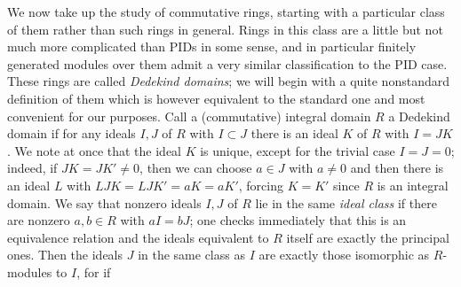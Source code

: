 We now take up the study of commutative rings, starting with a particular class of them rather than such rings in general.  Rings in this class are a little but not much more complicated than PIDs in some sense, and in particular finitely generated modules over them admit a very similar classification to the PID case.  These rings are called {\sl Dedekind domains}; we will begin with a quite nonstandard definition of them which is however equivalent to the standard one and most convenient for our purposes.  Call a (commutative) integral domain $R$ a Dedekind domain if for any ideals $I,J$ of $R$ with $I\subset J$ there is an ideal $K$ of $R$ with $I = JK$.  We note at once that the ideal $K$ is unique, except for the trivial case $I = J = 0$; indeed, if $JK = JK'\ne0$, then we can choose $a\in J$ with $a\ne0$ and then there is an ideal $L$ with $LJK = LJK' = aK = aK'$, forcing $K = K'$ since $R$ is an integral domain.  We say that nonzero ideals $I,J$ of $R$ lie in the same {\sl ideal class} if there are nonzero $a,b\in R$ with $aI = bJ$; one checks immediately that this is an equivalence relation and the ideals equivalent to $R$ itself are exactly the principal ones.  Then the ideals $J$ in the same class as $I$ are exactly those isomorphic as $R$-modules to $I$, for if
